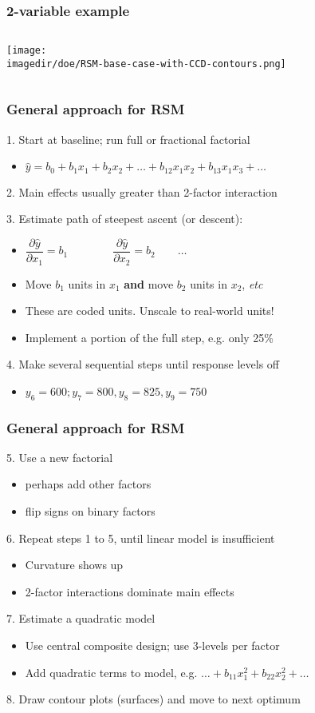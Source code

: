 \begin{frame}\frametitle{2-variable example}
	\begin{columns}
		\column{6cm}
			\begin{center}
				\texttt{[image: \\imagedir/doe/RSM-base-case-with-CCD-contours.png]} 
			\end{center}
		\column{4cm}
	\end{columns}
\end{frame}

\begin{frame}\frametitle{General approach for RSM}

	1. Start at baseline; run full or fractional factorial
	\begin{itemize}
		\item	$ \hat{y} = b_0 + b_1x_1 + b_2 x_2 + \ldots + b_{12}x_1x_2 + b_{13} x_1 x_3 + \ldots$
	\end{itemize}
	2. Main effects usually greater than 2-factor interaction

	3. Estimate path of steepest ascent (or descent):
	\begin{itemize}
		\item	$\dfrac{\partial \hat{y}}{\partial x_1} = b_1 \qquad\qquad \dfrac{\partial \hat{y}}{\partial x_2} = b_2 \qquad \ldots$
		\item	Move $b_1$ units in $x_1$ \textbf{and} move $b_2$ units in $x_2$, \emph{etc}
		\item	These are coded units. Unscale to real-world units!
		\item	Implement a portion of the full step, e.g. only 25\%
	\end{itemize}

	4. Make several sequential steps until response levels off
	\begin{itemize}
		\item	$y_6 = 600; y_7 = 800, y_8 = 825, y_9 = 750$
	\end{itemize}
\end{frame}

\begin{frame}\frametitle{General approach for RSM}

	5. Use a new factorial
	\begin{itemize}
		\item	perhaps add other factors
		\item	flip signs on binary factors
	\end{itemize}
	6. Repeat steps 1 to 5, until linear model is insufficient
	\begin{itemize}
		\item	Curvature shows up
		\item	2-factor interactions dominate main effects
	\end{itemize}
	7. Estimate a quadratic model
	\begin{itemize}
		\item	Use central composite design; use 3-levels per factor
		\item	Add quadratic terms to model, e.g. $\ldots + b_{11}x_1^2 + b_{22}x_2^2 + \ldots$
	\end{itemize}
	8. Draw contour plots (surfaces) and move to next optimum
\end{frame}

